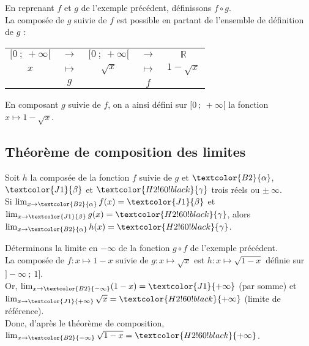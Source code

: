 \documentclass{cornouaille}
\begin{document}
\begin{exemple}
 En reprenant $f$ et $g$ de l'exemple précédent, définissons $f\circ g$.\\
La composée de $g$ suivie de $f$ est possible en partant de l'ensemble de définition de $g$ :
\begin{center}\renewcommand{\arraystretch}{0.7}
\begin{tabular}{c@{}c@{}c@{}c@{}c}
$[0~;~+\infty[$ & $\rightarrow$ & $[0~;~+\infty[$ &  $\rightarrow$ & $\mathbb{R}$ \\
$x$ & $\,\mapsto\,$ & $\sqrt{x}$ & $\,\mapsto\,$ & $1-\sqrt{x}$ \\
 & $g$ & &  $f$ & \\
\end{tabular}\renewcommand{\arraystretch}{1.}
\end{center}
En composant $g$ suivie de $f$, on a ainsi défini sur $[0~;~+\infty[$ la fonction $x\mapsto1-\sqrt{x}$.
\end{exemple}


\subsection{Théorème de composition des limites}

\begin{theoreme}
Soit $h$ la composée de la fonction $f$ suivie de $g$ et
$\textcolor{B2}{\alpha}$, $\textcolor{J1}{\beta}$ et
$\textcolor{H2!60!black}{\gamma}$ trois réels ou $\pm\ \infty$.\\
Si $\lim_{x\to\textcolor{B2}{\alpha}} f(x)=\textcolor{J1}{\beta}$ et $\lim_{x\to\textcolor{J1}{\beta}} g(x)=\textcolor{H2!60!black}{\gamma}$, alors $\lim_{x\to\textcolor{B2}{\alpha}} h(x)=\textcolor{H2!60!black}{\gamma}$.
\end{theoreme}

\begin{exemple}
Déterminons la limite en $-\infty$ de la fonction  $g\circ f$ de l'exemple précédent.\\
La composée de $f:x\mapsto 1-x$ suivie de $g:x\mapsto\sqrt{x}$ est $h:x\mapsto \sqrt{1-x}$ définie sur $]-\infty~;~1]$.\\
Or, $\lim_{x\to\textcolor{B2}{-\infty}} (1-x)=\textcolor{J1}{+\infty}$ (par somme) et $\lim_{x\to\textcolor{J1}{+\infty}}  \sqrt{x}=\textcolor{H2!60!black}{+\infty}$ (limite de référence).\\
Donc, d'après le théorème de composition, $\lim_{x\to\textcolor{B2}{-\infty}} \sqrt{1-x}=\textcolor{H2!60!black}{+\infty}$.
\end{exemple}
\end{document}
